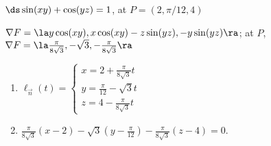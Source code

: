{$\ds \sin(xy)+\cos(yz)=1$, at $P = (2, \pi/12, 4)$
}
{
$\nabla F = \la y\cos(xy), x\cos(xy)-z\sin(yz), -y\sin(yz)\ra$; at $P$, $\nabla F = \la \frac{\pi}{8\sqrt{3}}, -\sqrt{3},-\frac{\pi}{8\sqrt{3}}\ra$
\begin{enumerate}
	\item $\ell_{\vec n}(t) = \left\{\begin{array}{l} x= 2 +\frac{\pi}{8\sqrt{3}}t\\ y = \frac{\pi}{12}-\sqrt{3}t\\ z = 4-\frac{\pi}{8\sqrt{3}}t \end{array}\right.$
	\item		$\frac{\pi}{8\sqrt{3}}(x-2) -\sqrt{3}(y-\frac{\pi}{12}) -\frac{\pi}{8\sqrt{3}}(z-4) = 0$.
\end{enumerate}
}